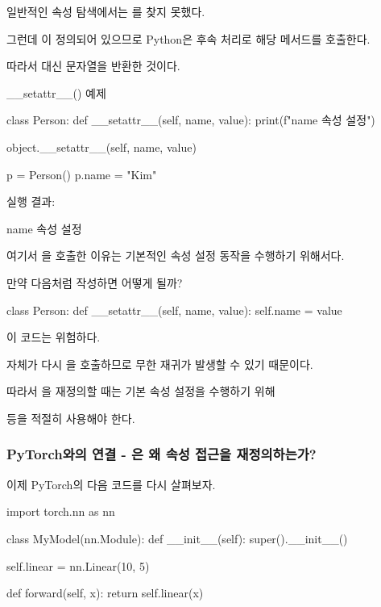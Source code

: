 일반적인 속성 탐색에서는 를 찾지 못했다.

그런데 이 정의되어 있으므로 Python은 후속 처리로 해당 메서드를 호출한다.

따라서  대신 문자열을 반환한 것이다.

\begin{dhknote}
\begin{dhksmry}[centered]
__setattr__() 예제
\end{dhksmry}
\end{dhknote}

\begin{dhkcode}
class Person:
    def __setattr__(self, name, value):
        print(f"{name} 속성 설정")

        object.__setattr__(self, name, value)


p = Person()
p.name = "Kim"
\end{dhkcode}

실행 결과:

\begin{dhkzsh}
name 속성 설정
\end{dhkzsh}

여기서 을 호출한 이유는 기본적인 속성 설정 동작을 수행하기 위해서다.

만약 다음처럼 작성하면 어떻게 될까?

\begin{dhkcode}
class Person:
    def __setattr__(self, name, value):
        self.name = value
\end{dhkcode}

이 코드는 위험하다.

 자체가 다시 을 호출하므로 무한 재귀가 발생할 수 있기 때문이다.

따라서 을 재정의할 때는 기본 속성 설정을 수행하기 위해

 등을 적절히 사용해야 한다.

\subsubsection{PyTorch와의 연결 - 은 왜 속성 접근을 재정의하는가?}

이제 PyTorch의 다음 코드를 다시 살펴보자.

\begin{dhkcode}
import torch.nn as nn

class MyModel(nn.Module):
    def __init__(self):
        super().__init__()

        self.linear = nn.Linear(10, 5)

    def forward(self, x):
        return self.linear(x)
\end{dhkcode}

